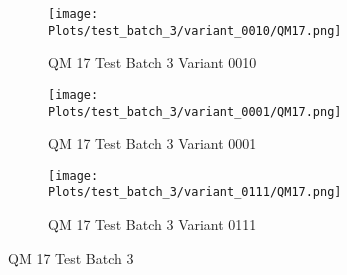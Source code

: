 \documentclass{DissertateFigs}
\begin{document}
\begin{figure}[t!]
\medskip

    \begin{subfigure}{0.43\textwidth}
    \texttt{[image: Plots/test\_batch\_3/variant\_0010/QM17.png]}
    \caption{QM 17 Test Batch 3 Variant 0010}
    \end{subfigure}
    \begin{subfigure}{0.43\textwidth}
    \texttt{[image: Plots/test\_batch\_3/variant\_0001/QM17.png]}
    \caption{QM 17 Test Batch 3 Variant 0001}
    \end{subfigure}

\medskip

    \begin{subfigure}{0.43\textwidth}
    \texttt{[image: Plots/test\_batch\_3/variant\_0111/QM17.png]}
    \caption{QM 17 Test Batch 3 Variant 0111}
    \end{subfigure}
\caption{QM 17 Test Batch 3}
    \end{figure}
\clearpage
\end{document}
